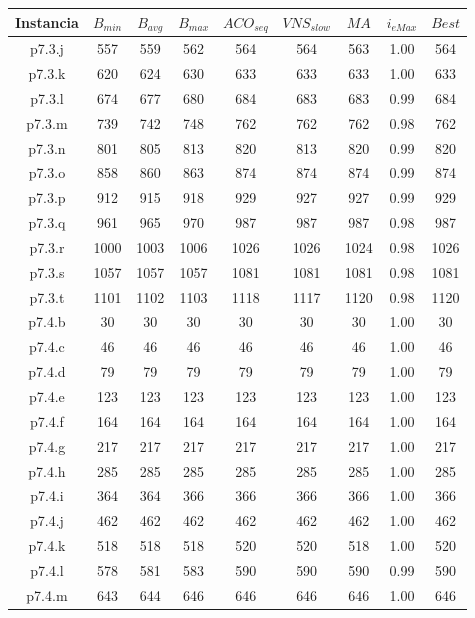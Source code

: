 \begin{table}
\begin{center}
\begin{tabular}{ |c|c|c|c|c|c|c|c|c| } 
\hline
Instancia & $B_{min}$ & $B_{avg}$ & $B_{max}$ & $ACO_{seq}$ & $VNS_{slow}$ & $MA$ & $i_{eMax}$ & $Best$ \\
\hline
p7.3.j & 557 & 559 & 562 & 564 & 564 & 563 & 1.00 & 564 \\
p7.3.k & 620 & 624 & 630 & 633 & 633 & 633 & 1.00 & 633 \\
p7.3.l & 674 & 677 & 680 & 684 & 683 & 683 & 0.99 & 684 \\
p7.3.m & 739 & 742 & 748 & 762 & 762 & 762 & 0.98 & 762 \\
p7.3.n & 801 & 805 & 813 & 820 & 813 & 820 & 0.99 & 820 \\
p7.3.o & 858 & 860 & 863 & 874 & 874 & 874 & 0.99 & 874 \\
p7.3.p & 912 & 915 & 918 & 929 & 927 & 927 & 0.99 & 929 \\
p7.3.q & 961 & 965 & 970 & 987 & 987 & 987 & 0.98 & 987 \\
p7.3.r & 1000 & 1003 & 1006 & 1026 & 1026 & 1024 & 0.98 & 1026 \\
p7.3.s & 1057 & 1057 & 1057 & 1081 & 1081 & 1081 & 0.98 & 1081 \\
p7.3.t & 1101 & 1102 & 1103 & 1118 & 1117 & 1120 & 0.98 & 1120 \\
p7.4.b & 30 & 30 & 30 & 30 & 30 & 30 & 1.00 & 30 \\
p7.4.c & 46 & 46 & 46 & 46 & 46 & 46 & 1.00 & 46 \\
p7.4.d & 79 & 79 & 79 & 79 & 79 & 79 & 1.00 & 79 \\
p7.4.e & 123 & 123 & 123 & 123 & 123 & 123 & 1.00 & 123 \\
p7.4.f & 164 & 164 & 164 & 164 & 164 & 164 & 1.00 & 164 \\
p7.4.g & 217 & 217 & 217 & 217 & 217 & 217 & 1.00 & 217 \\
p7.4.h & 285 & 285 & 285 & 285 & 285 & 285 & 1.00 & 285 \\
p7.4.i & 364 & 364 & 366 & 366 & 366 & 366 & 1.00 & 366 \\
p7.4.j & 462 & 462 & 462 & 462 & 462 & 462 & 1.00 & 462 \\
p7.4.k & 518 & 518 & 518 & 520 & 520 & 518 & 1.00 & 520 \\
p7.4.l & 578 & 581 & 583 & 590 & 590 & 590 & 0.99 & 590 \\
p7.4.m & 643 & 644 & 646 & 646 & 646 & 646 & 1.00 & 646 \\

\end{tabular}
\end{center}
\end{table}
